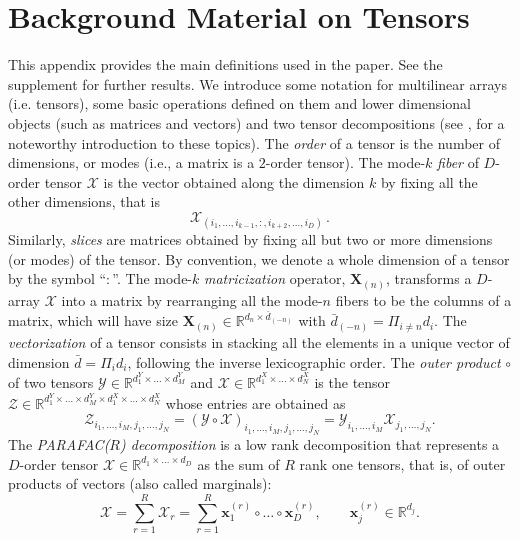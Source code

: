 \documentclass[12pt,a4paper]{article}
\def \R{\mathds{R}}
\theoremstyle{custom}
\begin{document}
\appendix
\renewcommand{\theequation}{\Alph{section}.\arabic{equation}} %

\renewcommand{\thesection}{\Alph{section}}

\section{Background Material on Tensors} \label{sec:apdx_tensor}
This appendix provides the main definitions used in the paper. See the supplement for further results.
We introduce some notation for multilinear arrays (i.e. tensors), some basic operations defined on them and lower dimensional objects (such as matrices and vectors) and two tensor decompositions (see \cite{KoldaBader09}, \cite{Cichocki16Tensor_theory} for a noteworthy introduction to these topics).
The \textit{order} of a tensor is the number of dimensions, or modes (i.e., a matrix is a $2$-order tensor).
The mode-$k$ \textit{fiber} of $D$-order tensor $\mathcal{X}$ is the vector obtained along the dimension $k$ by fixing all the other dimensions, that is
\begin{equation}
\mathcal{X}_{(i_1,\ldots,i_{k-1},:,i_{k+2},\ldots,i_D)} \, .
\end{equation}
Similarly, \textit{slices} are matrices obtained by fixing all but two or more dimensions (or modes) of the tensor. By convention, we denote a whole dimension of a tensor by the symbol ``$:$''. 
The mode-$k$ \textit{matricization} operator, $\mathbf{X}_{(n)}$, transforms a $D$-array $\mathcal{X}$ into a matrix by rearranging all the mode-$n$ fibers to be the columns of a matrix, which will have size $\mathbf{X}_{(n)}\in\R^{d_n\times\bar{d}_{(-n)}}$ with $\bar{d}_{(-n)}=\Pi_{i\neq n} d_i$. The \textit{vectorization} of a tensor consists in stacking all the elements in a unique vector of dimension $\bar{d}=\Pi_{i} d_i$, following the inverse lexicographic order.
The \textit{outer product} $\circ$ of two tensors $\mathcal{Y}\in\R^{d_1^Y \times\ldots\times d_M^Y}$ and $\mathcal{X}\in\R^{d_1^X \times\ldots\times d_N^X}$ is the tensor $\mathcal{Z}\in\R^{d_1^Y \times\ldots\times d_M^Y \times d_1^X \times\ldots\times d_N^X}$ whose entries are obtained as
\begin{equation}
\mathcal{Z}_{i_1,\ldots,i_M,j_1,\ldots,j_N} = (\mathcal{Y} \circ \mathcal{X})_{i_1,\ldots,i_M,j_1,\ldots,j_N} = \mathcal{Y}_{i_1,\ldots,i_M} \mathcal{X}_{j_1,\ldots,j_N}.
\label{eq:apdx_tensor_outer_product}
\end{equation}
The \textit{PARAFAC($R$) decomposition} is a low rank decomposition that represents a $D$-order tensor $\mathcal{X}\in\R^{d_1\times\ldots\times d_D}$ as the sum of $R$ rank one tensors, that is, of outer products of vectors (also called marginals):
\begin{equation}
\mathcal{X} = \sum_{r=1}^{R} \mathcal{X}_r = \sum_{r=1}^{R} \mathbf{x}_1^{(r)} \circ \ldots \circ \mathbf{x}_D^{(r)}, \qquad \mathbf{x}_j^{(r)} \in \R^{d_j}.
\label{eq:PARAFAC_demposition}
\end{equation}
\end{document}
